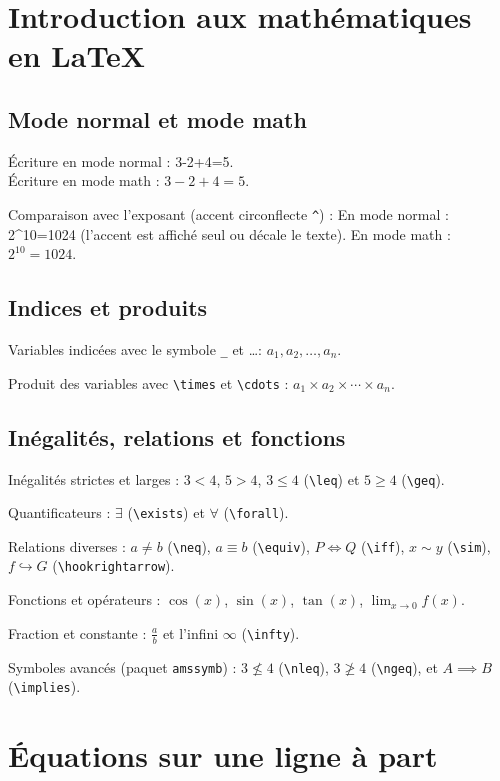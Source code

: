 \documentclass{article}
\begin{document}
\section{Introduction aux mathématiques en LaTeX}

\subsection{Mode normal et mode math}
Écriture en mode normal : 3-2+4=5. \\
Écriture en mode math : $3-2+4=5$.

Comparaison avec l'exposant (accent circonflecte \verb|^|) :
En mode normal : 2^{10}=1024 (l'accent est affiché seul ou décale le texte).
En mode math : $2^{10} = 1024$.

\subsection{Indices et produits}
Variables indicées avec le symbole \verb|_| et \ldots : 
$a_1, a_2, \dots, a_n$.

Produit des variables avec \verb|\times| et \verb|\cdots| :
$a_1 \times a_2 \times \cdots \times a_n$.

\subsection{Inégalités, relations et fonctions}
Inégalités strictes et larges : 
$3 < 4$, $5 > 4$, $3 \leq 4$ (\verb|\leq|) et $5 \geq 4$ (\verb|\geq|).

Quantificateurs : $\exists$ (\verb|\exists|) et $\forall$ (\verb|\forall|).

Relations diverses : 
$a \neq b$ (\verb|\neq|), 
$a \equiv b$ (\verb|\equiv|), 
$P \iff Q$ (\verb|\iff|), 
$x \sim y$ (\verb|\sim|), 
$f \hookrightarrow G$ (\verb|\hookrightarrow|).

Fonctions et opérateurs : 
$\cos(x)$, $\sin(x)$, $\tan(x)$, $\lim_{x \to 0} f(x)$.

Fraction et constante : 
$\frac{a}{b}$ et l'infini $\infty$ (\verb|\infty|).

Symboles avancés (paquet \texttt{amssymb}) :
$3 \nleq 4$ (\verb|\nleq|), $3 \ngeq 4$ (\verb|\ngeq|), et $A \implies B$ (\verb|\implies|).

\section{Équations sur une ligne à part}
\end{document}
